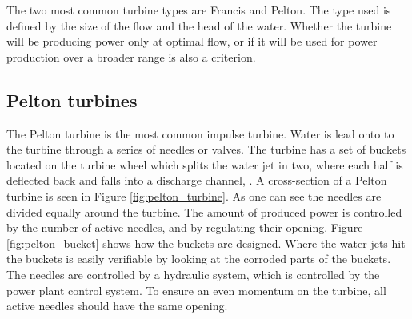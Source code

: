     
    The two most common turbine types are Francis and Pelton. The type used is defined by the size of the flow and the head of the water. Whether the turbine will be producing power only at optimal flow, or if it will be used for power production over a broader range is also a criterion. 
    
    
    
    \subsection{Pelton turbines}\label{subsec:pelton}
        
        The Pelton turbine is the most common impulse turbine. Water is lead onto to the turbine through a series of needles or valves. The turbine has a set of buckets located on the turbine wheel which splits the water jet in two, where each half is deflected back and falls into a discharge channel, \cite{Paish2002}. A cross-section of a Pelton turbine is seen in Figure \ref{fig:pelton_turbine}. As one can see the needles are divided equally around the turbine. The amount of produced power is controlled by the number of active needles, and by regulating their opening. Figure \ref{fig:pelton_bucket} shows how the buckets are designed. Where the water jets hit the buckets is easily verifiable by looking at the corroded parts of the buckets. The needles are controlled by a hydraulic system, which is controlled by the power plant control system. To ensure an even momentum on the turbine, all active needles should have the same opening. 
        
